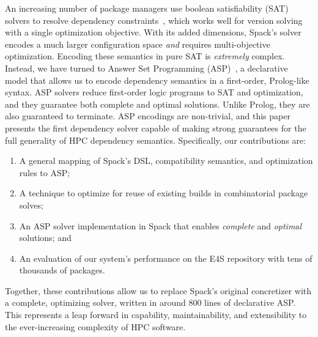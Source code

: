 An increasing number of package managers use boolean satisfiability (SAT) solvers to
resolve dependency constraints~\cite{abate2020dependency}, which works well for version
solving with a single optimization objective. With its added dimensions, Spack's solver
encodes a much larger configuration space {\it and} requires multi-objective
optimization. Encoding these semantics in pure SAT is {\it extremely} complex. Instead,
we have turned to Answer Set Programming
(ASP)~\cite{gebser+:asp-book,marek+:asp-origins}, a declarative model that allows us to
encode dependency semantics in a first-order, Prolog-like syntax. ASP solvers reduce
first-order logic programs to SAT and optimization, and they guarantee both complete
and optimal solutions. Unlike Prolog, they are also guaranteed to terminate. ASP
encodings are non-trivial, and this paper presents the first dependency solver capable
of making strong guarantees for the full generality of HPC dependency semantics.
Specifically, our contributions are:

\begin{enumerate}
\item A general mapping of Spack's DSL, compatibility semantics, and optimization rules
  to ASP;
\item A technique to optimize for reuse of existing builds in combinatorial package
  solves;
\item An ASP solver implementation in Spack that enables {\it complete} and {\it
  optimal} solutions; and
\item An evaluation of our system's performance on the E4S repository with tens of
  thousands of packages.
\end{enumerate}

Together, these contributions allow us to replace Spack's original concretizer with a
complete, optimizing solver, written in around 800 lines of declarative ASP. This
represents a leap forward in capability, maintainability, and extensibility to the
ever-increasing complexity of HPC software.
